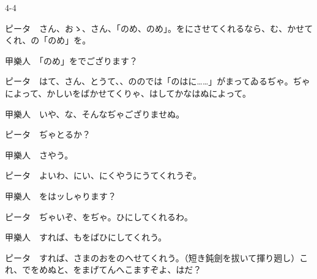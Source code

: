 \documentclass[tate,paper=b6j,jafontsize=9pt]{jlreq}
\begin{document}
\begin{azconvIndented}{4\zw}{-4\zw}

ピータ　さん、おゝ、さん、「のめ、のめ」。をにさせてくれるなら、む、かせてくれ、の「のめ」を。

甲樂人　「のめ」をでござります？

ピータ　はて、さん、とうて、、ののでは「のはに……」がまってゐるぢゃ。ぢゃによって、かしいをばかせてくりゃ、はしてかなはぬによって。

甲樂人　いや、な、そんなぢゃござりませぬ。

ピータ　ぢゃとるか？

甲樂人　さやう。

ピータ　よいわ、にい、にくやうにうてくれうぞ。

甲樂人　をはッしゃります？

ピータ　ぢゃいぞ、をぢゃ。ひにしてくれるわ。

甲樂人　すれば、もをばひにしてくれう。

ピータ　すれば、さまのおをのへせてくれう。（短き鈍劍を拔いて揮り𢌞し）これ、でをめぬと、をまげてんへこますぞよ、はだ？


\end{azconvIndented}
\end{document}
